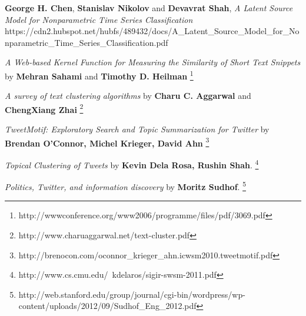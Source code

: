 \begin{thebibliography}{9}

 \textbf{George H. Chen}, \textbf{Stanislav Nikolov} and \textbf{Devavrat Shah}, \textit{A Latent Source Model for Nonparametric Time Series Classification} https://cdn2.hubspot.net/hubfs/489432/docs/A_Latent_Source_Model_for_Nonparametric_Time_Series_Classification.pdf

\end{thebibliography}

\textit{A Web-based Kernel Function for Measuring the Similarity of Short Text Snippets} by \textbf{Mehran Sahami} and \textbf{Timothy D. Heilman} \footnote{http://wwwconference.org/www2006/programme/files/pdf/3069.pdf}

\textit{A survey of text clustering algorithms} by \textbf{Charu C. Aggarwal} and \textbf{ChengXiang Zhai} \footnote{http://www.charuaggarwal.net/text-cluster.pdf}

\textit{TweetMotif: Exploratory Search and Topic Summarization for Twitter} by \textbf{Brendan O’Connor, Michel Krieger, David Ahn} \footnote{http://brenocon.com/oconnor_krieger_ahn.icwsm2010.tweetmotif.pdf}

\textit{Topical Clustering of Tweets} by \textbf{Kevin Dela Rosa, Rushin Shah}. \footnote{http://www.cs.cmu.edu/~kdelaros/sigir-swsm-2011.pdf}

\textit{Politics, Twitter, and information discovery} by \textbf{Moritz Sudhof}. \footnote{http://web.stanford.edu/group/journal/cgi-bin/wordpress/wp-content/uploads/2012/09/Sudhof_Eng_2012.pdf}

